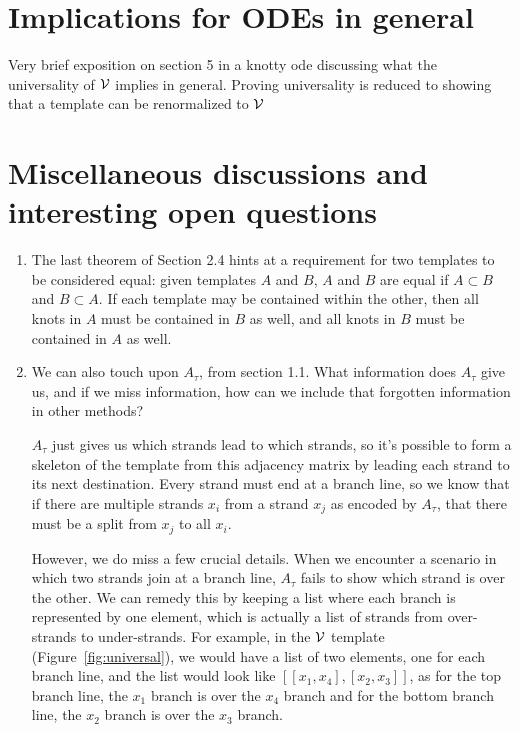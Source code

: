 \documentclass[paper.tex]{subfiles}
\begin{document}
\section{Implications for ODEs in general}

Very brief exposition on section 5 in a knotty ode discussing what the universality of $\mathcal{V}$ implies in general. Proving universality is reduced to showing that a template can be renormalized to $\mathcal{V}$


\section{Miscellaneous discussions and interesting open questions}
\label{sec:misc}

\begin{enumerate} 
       \item  The last theorem of Section 2.4 hints at a requirement for two templates to be considered equal: given templates $A$ and $B$, $A$ and $B$ are equal if $A \subset B$ and $B \subset A$. If each template may be contained within the other, then all knots in $A$ must be contained in $B$ as well, and all knots in $B$ must be contained in $A$ as well.


   \item We can also touch upon $A_\tau$, from section 1.1. What information does $A_\tau$ give us, and if we miss information, how can we include that forgotten information in other methods? 

       $A_\tau$ just gives us which strands lead to which strands, so it's possible to form a skeleton of the template from this adjacency matrix by leading each strand to its next destination. Every strand must end at a branch line, so we know that if there are multiple strands $x_i$ from a strand $x_j$ as encoded by $A_\tau$, that there must be a split from $x_j$ to all $x_i$. 

       However, we do miss a few crucial details. When we encounter a scenario in which two strands join at a branch line, $A_\tau$ fails to show which strand is over the other. We can remedy this by keeping a list where each branch is represented by one element, which is actually a list of strands from over-strands to under-strands. For example, in the $\mathcal{V}$ template (Figure~\ref{fig:universal}), we would have a list of two elements, one for each branch line, and the list would look like $[[x_1, x_4], [x_2, x_3]]$, as for the top branch line, the $x_1$ branch is over the $x_4$ branch and for the bottom branch line, the $x_2$ branch is over the $x_3$ branch. 


\end{enumerate}
\end{document}
